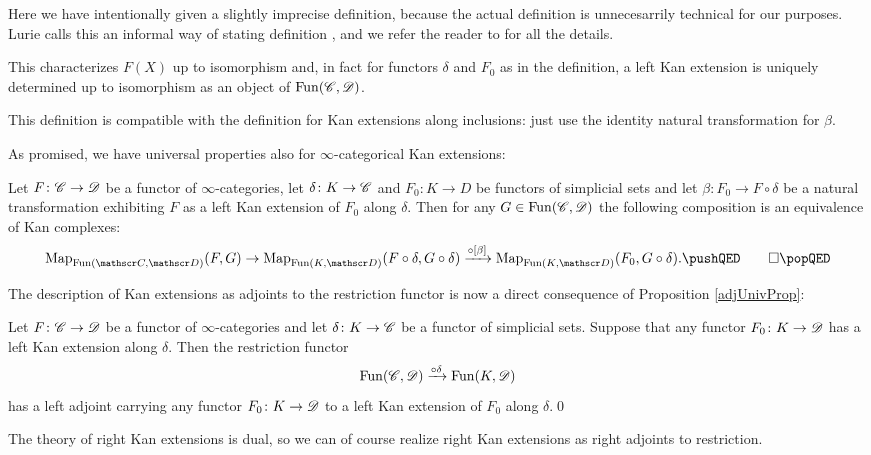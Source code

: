 \documentclass[../../thesis.tex]{subfiles}
\begin{document}
\begin{remark}
    Here we have intentionally given a slightly imprecise definition, because the actual definition is unnecesarrily technical for our purposes.
    Lurie calls this an informal way of stating definition \cite[\href{https://kerodon.net/tag/02YC}{Variant 02YC}]{kerodon}, and we refer the reader to \cite[\href{https://kerodon.net/tag/02Y7}{Subsection 02Y7}]{kerodon} for all the details.
\end{remark}
\begin{remark}
    This characterizes $F(X)$ up to isomorphism and, in fact for functors $\delta$ and $F_0$ as in the definition, a left Kan extension is uniquely determined up to isomorphism as an object of $\mathrm{Fun}(\mathscr{C}, \mathscr{D})$.
\end{remark}
\begin{remark}
    This definition is compatible with the definition for Kan extensions along inclusions: just use the identity natural transformation for $\beta$.
\end{remark}
As promised, we have universal properties also for $\infty$-categorical Kan extensions:
\begin{proposition}
    Let $F \colon\mathscr{C} \to \mathscr{D}$ be a functor of $\infty$-categories, let ${\delta \colon K\to \mathscr{C}}$ and $F_0 \colon K \to D$ be functors of simplicial sets and let $\beta \colon F_0 \to F \circ \delta$ be a natural transformation exhibiting $F$ as a left Kan extension of $F_0$ along $\delta$.
    Then for any $G \in \mathrm{Fun}(\mathscr{C}, \mathscr{D})$ the following composition is an equivalence of Kan complexes:
    \[
        \map_{\Fun(\C,\D)}(F,G) \to \map_{\Fun(K,\D)}(F \circ \delta , G \circ \delta) \xrightarrow{\circ [\beta]} \map_{\Fun(K,\D)}(F_0, G\circ \delta).\equationQED        \]
\end{proposition}
The description of Kan extensions as adjoints to the restriction functor is now a direct consequence of Proposition \ref{adjUnivProp}:
\begin{corollary}
    Let $F \colon \mathscr{C} \to \mathscr{D}$ be a functor of $\infty$-categories and let ${\delta \colon K\to \mathscr{C}}$ be a functor of simplicial sets.
    Suppose that any functor $F_0 \colon K \to \mathscr{D}$ has a left Kan extension along $\delta$.
    Then the restriction functor
    \[
        \mathrm{Fun}(\mathscr{C}, \mathscr{D}) \xrightarrow{\circ \delta} \mathrm{Fun}(K, \mathscr{D})
    \]
    has a left adjoint carrying any functor $F_0 \colon K \to \mathscr{D}$ to a left Kan extension of $F_0$ along $\delta$.\qed
\end{corollary}
The theory of right Kan extensions is dual, so we can of course realize right Kan extensions as right adjoints to restriction.
\end{document}
